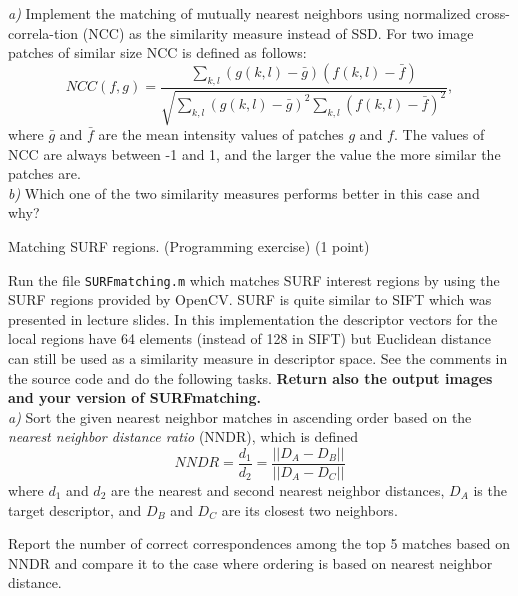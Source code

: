 \documentclass[12pt]{article} %
\newenvironment{exercise}[2][Task]{\begin{trivlist}
\item[\hskip \labelsep {\bfseries #1}\hskip \labelsep {\bfseries #2.}]}{\end{trivlist}}
\begin{document}
\begin{exercise}{1}
\begin{exercise}{3}
\noindent \textit{a)} Implement the matching of mutually nearest neighbors using normalized cross-correla-tion (NCC) as the similarity measure instead of SSD. For two image patches of similar size NCC is defined as follows:
\begin{equation}
NCC(f,g)=\frac{\sum_{k,l}(g(k,l)-\bar{g})(f(k,l)-\bar{f})}{\sqrt{\sum_{k,l}(g(k,l)-\bar{g})^2\sum_{k,l}(f(k,l)-\bar{f})^2}},
\end{equation}
where $\bar{g}$ and $\bar{f}$ are the mean intensity values of patches $g$ and $f$. The values of NCC are always between -1 and 1, and the larger the value the more similar the patches are.\\


\noindent \textit{b)} Which one of the two similarity measures performs better in this case and why?
\end{exercise}

\vspace{1mm}


\begin{exercise}{4} 
Matching SURF regions. (Programming exercise) (1 point)

\noindent Run the file  \texttt{SURFmatching.m} which matches SURF interest regions by using the SURF regions provided by OpenCV. SURF is quite similar to SIFT which was presented in lecture slides. In this implementation the descriptor vectors for the local regions have 64 elements (instead of 128 in SIFT) but Euclidean distance can still be used as a similarity measure in descriptor space. See the comments in the source code and do the following tasks. \textbf{Return also the output images and your version of SURFmatching.}\\

\noindent
\textit{a)} Sort the given nearest neighbor matches in ascending order based on the \emph{nearest neighbor distance ratio} (NNDR), which is defined
\begin{equation*}
	NNDR = \frac{d_{1}}{d_{2}} = \frac{||D_{A} - D_{B}||}{||D_{A} - D_{C}||}
\end{equation*}
where $d_{1}$ and $d_{2}$ are the nearest and second nearest neighbor distances, $D_{A}$ is the target descriptor, and $D_{B}$ and $D_{C}$ are its closest two neighbors.

\noindent
Report the number of correct correspondences among the top 5 matches based on NNDR and compare it to the case where ordering is based on nearest neighbor distance. \\


\end{exercise}
\end{exercise}
\end{document}
